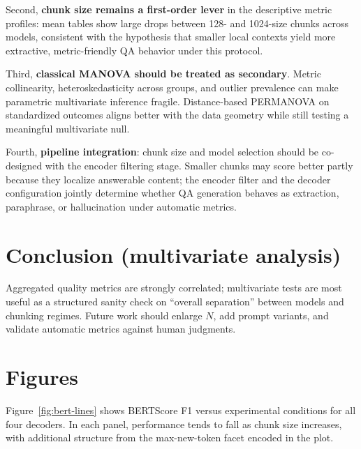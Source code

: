 \documentclass[11pt]{article}
\begin{document}
Second, \textbf{chunk size remains a first-order lever} in the descriptive metric profiles: mean tables show large drops between 128- and 1024-size chunks across models, consistent with the hypothesis that smaller local contexts yield more extractive, metric-friendly QA behavior under this protocol.

Third, \textbf{classical MANOVA should be treated as secondary}. Metric collinearity, heteroskedasticity across groups, and outlier prevalence can make parametric multivariate inference fragile. Distance-based PERMANOVA on standardized outcomes aligns better with the data geometry while still testing a meaningful multivariate null.

Fourth, \textbf{pipeline integration}: chunk size and model selection should be co-designed with the encoder filtering stage. Smaller chunks may score better partly because they localize answerable content; the encoder filter and the decoder configuration jointly determine whether QA generation behaves as extraction, paraphrase, or hallucination under automatic metrics.

\section{Conclusion (multivariate analysis)}

Aggregated quality metrics are strongly correlated; multivariate tests are most useful as a structured sanity check on ``overall separation'' between models and chunking regimes. Future work should enlarge $N$, add prompt variants, and validate automatic metrics against human judgments.

\section{Figures}

Figure~\ref{fig:bert-lines} shows BERTScore F1 versus experimental conditions for all four decoders. In each panel, performance tends to fall as chunk size increases, with additional structure from the max-new-token facet encoded in the plot.
\end{document}
